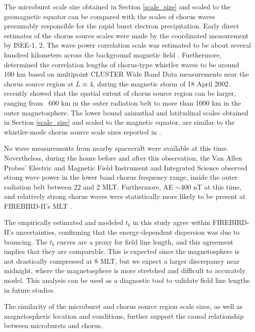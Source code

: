 \documentclass[draft, linenumbers]{agujournal}
\begin{document}
The microburst scale size obtained in Section \ref{scale_size} and scaled to the geomagnetic equator can be compared with the scales of chorus waves presumably responsible for the rapid burst electron precipitation. Early direct estimates of the chorus source scales were made by the coordinated measurement by ISEE-1, 2. The wave power correlation scale was estimated to be about several hundred kilometers across the background magnetic field \citep{Gurnett1979}. Furthermore, \citet{Santolik2003} determined the correlation lengths of chorus-type whistler waves to be around 100 km based on multipoint CLUSTER Wide Band Data measurements near the chorus source region at $L \approx 4$, during the magnetic storm of 18 April 2002. \citet{Agapitov2010, Agapitov2011b, Agapitov2017a} recently showed that the spatial extent of chorus source region can be larger, ranging from ~600 km in the outer radiation belt to more than 1000 km in the outer magnetosphere. The lower bound azimuthal and latitudinal scales obtained in Section \ref{scale_size} and scaled to the magnetic equator, are similar to the whistler-mode chorus source scale sizes reported in \citet{Agapitov2011b, Agapitov2017a}. 

No wave measurements from nearby spacecraft were available at this time. Nevertheless, during the hours before and after this observation, the Van Allen Probes' \citep{Mauk2013} Electric and Magnetic Field Instrument and Integrated Science \citep{Kletzing2013} observed strong wave power in the lower band chorus frequency range, inside the outer radiation belt between 22 and 2 MLT. Furthermore, AE $\sim 400$ nT at this time, and relatively strong chorus waves were statistically more likely to be present at FIREBIRD-II's MLT \citep{Li2009}.

The empirically estimated and modeled $t_b$ in this study agree within FIREBIRD-II's uncertainties, confirming that the energy-dependent dispersion was due to bouncing. The $t_b$ curves are a proxy for field line length, and this agreement implies that they are comparable. This is expected since the magnetosphere is not drastically compressed at 8 MLT, but we expect a larger discrepancy near midnight, where the magnetosphere is more stretched and difficult to accurately model. This analysis can be used as a diagnostic tool to validate field line lengths in future studies.

The similarity of the microburst and chorus source region scale sizes, as well as magnetospheric location and conditions, further support the causal relationship between microbursts and chorus.
\end{document}
